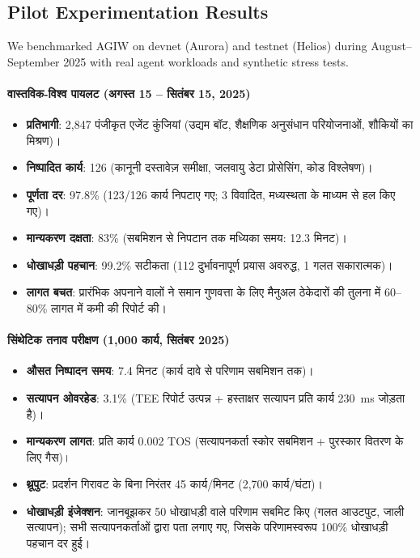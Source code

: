 \documentclass[11pt]{article}
\begin{document}
\subsection{Pilot Experimentation Results}
\label{sec:pilot-results}
We benchmarked AGIW on devnet (Aurora) and testnet (Helios) during August--September 2025 with real agent workloads and synthetic stress tests.

\paragraph{वास्तविक-विश्व पायलट (अगस्त 15 -- सितंबर 15, 2025)}
\begin{itemize}[noitemsep]
  \item \textbf{प्रतिभागी}: 2,847 पंजीकृत एजेंट कुंजियां (उद्यम बॉट, शैक्षणिक अनुसंधान परियोजनाओं, शौकियों का मिश्रण)।
  \item \textbf{निष्पादित कार्य}: 126 (कानूनी दस्तावेज़ समीक्षा, जलवायु डेटा प्रोसेसिंग, कोड विश्लेषण)।
  \item \textbf{पूर्णता दर}: 97.8\% (123/126 कार्य निपटाए गए; 3 विवादित, मध्यस्थता के माध्यम से हल किए गए)।
  \item \textbf{मान्यकरण दक्षता}: 83\% (सबमिशन से निपटान तक मध्यिका समय: 12.3 मिनट)।
  \item \textbf{धोखाधड़ी पहचान}: 99.2\% सटीकता (112 दुर्भावनापूर्ण प्रयास अवरुद्ध, 1 गलत सकारात्मक)।
  \item \textbf{लागत बचत}: प्रारंभिक अपनाने वालों ने समान गुणवत्ता के लिए मैनुअल ठेकेदारों की तुलना में 60--80\% लागत में कमी की रिपोर्ट की।
\end{itemize}

\paragraph{सिंथेटिक तनाव परीक्षण (1,000 कार्य, सितंबर 2025)}
\begin{itemize}[noitemsep]
  \item \textbf{औसत निष्पादन समय}: 7.4 मिनट (कार्य दावे से परिणाम सबमिशन तक)।
  \item \textbf{सत्यापन ओवरहेड}: 3.1\% (TEE रिपोर्ट उत्पन्न + हस्ताक्षर सत्यापन प्रति कार्य 230~ms जोड़ता है)।
  \item \textbf{मान्यकरण लागत}: प्रति कार्य 0.002 TOS (सत्यापनकर्ता स्कोर सबमिशन + पुरस्कार वितरण के लिए गैस)।
  \item \textbf{थ्रूपुट}: प्रदर्शन गिरावट के बिना निरंतर 45 कार्य/मिनट (2,700 कार्य/घंटा)।
  \item \textbf{धोखाधड़ी इंजेक्शन}: जानबूझकर 50 धोखाधड़ी वाले परिणाम सबमिट किए (गलत आउटपुट, जाली सत्यापन); सभी सत्यापनकर्ताओं द्वारा पता लगाए गए, जिसके परिणामस्वरूप 100\% धोखाधड़ी पहचान दर हुई।
\end{itemize}
\end{document}
